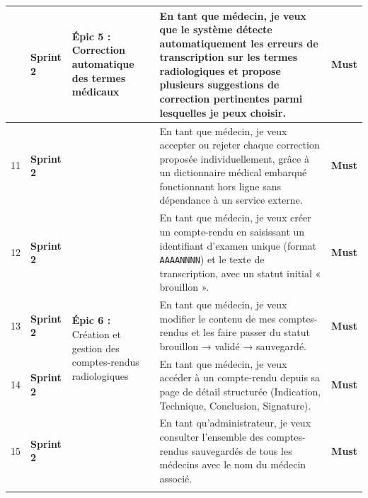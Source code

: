 \documentclass[12pt,a4paper]{article}
\newcommand{\must}{\textcolor{must}{\textbf{Must}}}
\newcommand{\sprinttwo}[1]{\cellcolor{sprint2bg}\textcolor{sprint2txt}{\textbf{#1}}}
\begin{document}
\begin{longtable}{
  |>{\centering\arraybackslash}p{0.7cm}
  |>{\centering\arraybackslash}p{2.2cm}
  |p{3.8cm}
  |p{6.8cm}
  |>{\centering\arraybackslash}p{1.4cm}|
}
10 & \sprinttwo{Sprint 2}
   & \multirow{2}{3.8cm}{\textbf{Épic 5 :} Correction automatique des termes médicaux}
   & En tant que médecin, je veux que le système détecte automatiquement les erreurs de transcription sur les termes radiologiques et propose plusieurs suggestions de correction pertinentes parmi lesquelles je peux choisir.
   & \must \\ \cline{1-2}\cline{4-5}

11 & \sprinttwo{Sprint 2} &
   & En tant que médecin, je veux accepter ou rejeter chaque correction proposée individuellement, grâce à un dictionnaire médical embarqué fonctionnant hors ligne sans dépendance à un service externe.
   & \must \\ \hline

12 & \sprinttwo{Sprint 2}
   & \multirow{4}{3.8cm}{\textbf{Épic 6 :} Création et gestion des comptes-rendus radiologiques}
   & En tant que médecin, je veux créer un compte-rendu en saisissant un identifiant d'examen unique (format \texttt{AAAANNNN}) et le texte de transcription, avec un statut initial « brouillon ».
   & \must \\ \cline{1-2}\cline{4-5}

13 & \sprinttwo{Sprint 2} &
   & En tant que médecin, je veux modifier le contenu de mes comptes-rendus et les faire passer du statut brouillon → validé → sauvegardé.
   & \must \\ \cline{1-2}\cline{4-5}

14 & \sprinttwo{Sprint 2} &
   & En tant que médecin, je veux accéder à un compte-rendu depuis sa page de détail structurée (Indication, Technique, Conclusion, Signature).
   & \must \\ \cline{1-2}\cline{4-5}

15 & \sprinttwo{Sprint 2} &
   & En tant qu'administrateur, je veux consulter l'ensemble des comptes-rendus sauvegardés de tous les médecins avec le nom du médecin associé.
   & \must \\ \hline


\multicolumn{5}{|c|}{\cellcolor{sprint3bg}\textcolor{sprint3txt}{\Large\bfseries Sprint 3 — Historique, Réclamations \& Export CSV}} \\ \hline


\end{longtable}
\end{document}

